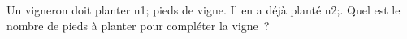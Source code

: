 \documentclass[exercice]{thedocument}%
\begin{document}
%
Un vigneron doit planter \<n1; pieds de vigne. Il en a déjà planté \<n2;.\vskip10pt\noindent
Quel est le nombre de pieds à planter pour compléter la vigne~?
\end{document}
